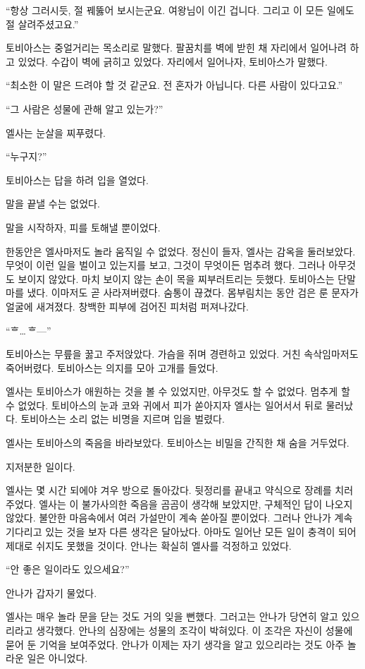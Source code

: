 ``항상 그러시듯, 절 꿰뚫어 보시는군요. 여왕님이 이긴 겁니다. 그리고 이 모든 일에도 절 살려주셨고요.''

토비아스는 중얼거리는 목소리로 말했다. 팔꿈치를 벽에 받힌 채 자리에서 일어나려 하고 있었다. 수갑이 벽에 긁히고 있었다. 자리에서 일어나자, 토비아스가 말했다.

``최소한 이 말은 드려야 할 것 같군요. 전 혼자가 아닙니다. 다른 사람이 있다고요.''

``그 사람은 성물에 관해 알고 있는가?''

엘사는 눈살을 찌푸렸다.

``누구지?''

토비아스는 답을 하려 입을 열었다.

말을 끝낼 수는 없었다.

말을 시작하자, 피를 토해낼 뿐이었다.

한동안은 엘사마저도 놀라 움직일 수 없었다. 정신이 들자, 엘사는 감옥을 둘러보았다. 무엇이 이런 일을 벌이고 있는지를 보고, 그것이 무엇이든 멈추려 했다. 그러나 아무것도 보이지 않았다. 마치 보이지 않는 손이 목을 찌부러트리는 듯했다. 토비아스는 단말마를 냈다. 이마저도 곧 사라져버렸다. 숨통이 끊겼다. 몸부림치는 동안 검은 룬 문자가 얼굴에 새겨졌다. 창백한 피부에 검어진 피처럼 퍼져나갔다.

``ᄒ\ldots\,ᄒ—''

토비아스는 무릎을 꿇고 주저앉았다. 가슴을 쥐며 경련하고 있었다. 거친 속삭임마저도 죽어버렸다. 토비아스는 의지를 모아 고개를 들었다.

엘사는 토비아스가 애원하는 것을 볼 수 있었지만, 아무것도 할 수 없었다. 멈추게 할 수 없었다. 토비아스의 눈과 코와 귀에서 피가 쏟아지자 엘사는 일어서서 뒤로 물러났다. 토비아스는 소리 없는 비명을 지르며 입을 벌렸다.

엘사는 토비아스의 죽음을 바라보았다. 토비아스는 비밀을 간직한 채 숨을 거두었다.

\textbreak

지저분한 일이다.

엘사는 몇 시간 되에야 겨우 방으로 돌아갔다. 뒷정리를 끝내고 약식으로 장례를 치러주었다. 엘사는 이 불가사의한 죽음을 곰곰이 생각해 보았지만, 구체적인 답이 나오지 않았다. 불안한 마음속에서 여러 가설만이 계속 쏟아질 뿐이었다. 그러나 안나가 계속 기다리고 있는 것을 보자 다른 생각은 달아났다. 아마도 일어난 모든 일이 충격이 되어 제대로 쉬지도 못했을 것이다. 안나는 확실히 엘사를 걱정하고 있었다.

``안 좋은 일이라도 있으세요?''

안나가 갑자기 물었다.

엘사는 매우 놀라 문을 닫는 것도 거의 잊을 뻔했다. 그러고는 안나가 당연히 알고 있으리라고 생각했다. 안나의 심장에는 성물의 조각이 박혀있다. 이 조각은 자신이 성물에 묻어 둔 기억을 보여주었다. 안나가 이제는 자기 생각을 알고 있으리라는 것도 아주 놀라운 일은 아니었다.

